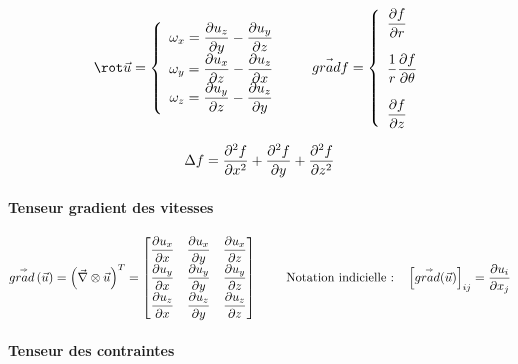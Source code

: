 
$$
\rot \vec{u} =  \left\{ 
\begin{array}{c} 
\displaystyle \omega_x = \dpa{u_z}{y}- \dpa{u_y}{z}\\
\displaystyle \omega_y = \dpa{u_x}{z}- \dpa{u_z}{x}\\
\displaystyle \omega_z = \dpa{u_y}{z}- \dpa{u_z}{y}\\
\end{array}
\right.
\qquad 
\vec{grad} f = 
 \left\{ 
\begin{array}{l} 
\displaystyle \frac{\partial f}{\partial r} \\ \\
\displaystyle \frac{1}{r} \frac{\partial f}{\partial \theta} \\ \\
\displaystyle \frac{\partial f}{\partial z} \\
\end{array}
\right.
$$

$$
\Delta f = \frac {\partial ^2 f} {\partial x^2} + \frac {\partial ^2 f} {\partial y} + \frac {\partial ^2 f} {\partial z^2}
$$

\paragraph{Tenseur gradient des vitesses}


$$
\displaystyle
\accentset{\Rightarrow}{grad} \left( \vec{u} \right) ={  \left( \vec{\nabla} \otimes \vec{u} \right) }^T =
\begin{bmatrix}
\displaystyle \frac{\partial u_x}{\partial x} & \displaystyle \frac{\partial u_x}{\partial y} & \displaystyle \frac{\partial u_x}{\partial z} \\
\displaystyle \frac{\partial u_y}{\partial x} & \displaystyle \frac{\partial u_y}{\partial y} & \displaystyle \frac{\partial u_y}{\partial z} \\
\displaystyle \frac{\partial u_z}{\partial x} & \displaystyle \frac{\partial u_z}{\partial y} & \displaystyle \frac{\partial u_z}{\partial z} 
\end{bmatrix}
\qquad \mbox{ Notation indicielle :} \quad 
\left[ \accentset{\Rightarrow}{grad} (\vec{u}) \right]_{ij} = \frac{\partial u_i}{\partial x_j}
$$

\paragraph{Tenseur des contraintes}

